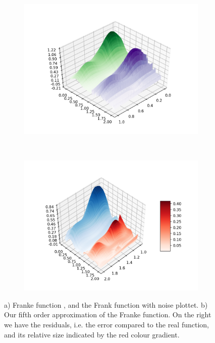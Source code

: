 \begin{figure}[H]
\centering
      \begin{subfigure}{0.45\textwidth}
       	\centering
       	\includegraphics[width=\linewidth]{result/bilder/Franke_noise.png}
        	\caption{}
     \end{subfigure}
     ~
     \begin{subfigure}{0.45\textwidth}
       	\centering
       	\includegraphics[width=\linewidth]{result/bilder/OLS_bar.png}
        	\caption{}
    	\end{subfigure}
 	\caption{a) \color{green}Franke function \color{black}, and the \color{purple}Frank function with noise plottet\color{black}. b) Our \color{blue}fifth order approximation of the Franke function\color{black}. On the right we have the \color{red}residuals\color{black}, i.e. the error compared to the real function, and its relative size indicated by the red colour gradient.}
	\label{fig:OLS_Frank}
\end{figure}


